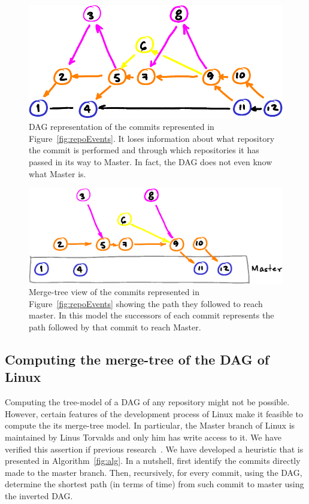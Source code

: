 \documentclass[conference, draftclsnofoot, draft]{IEEEtran}
\begin{document}
\begin{figure}[htbp]
  \centering
        \includegraphics[width=.8\columnwidth]{figures/dag.pdf}
  \caption{DAG representation of the commits represented in Figure~\ref{fig:repoEvents}. It loses information about what repository the commit is performed and
    through which repositories it has passed in its way to Master. In fact, the DAG does not even know what Master is.}
  \label{fig:repoDAG}
\end{figure}

\begin{figure}[htbp]
  \centering
        \includegraphics[width=\columnwidth]{figures/tree.pdf}
  \caption{Merge-tree view of the commits  represented in Figure~\ref{fig:repoEvents} showing the path they followed to reach master. In this model the successors of
    each commit represents the path followed by that commit to reach Master.}
  \label{fig:repoTree}
\end{figure}


\subsection{Computing the merge-tree of the DAG of Linux}

Computing the tree-model of a DAG of any repository might not be possible. However, certain features of the development process of Linux make it feasible to
compute the its merge-tree model. In particular, the Master branch of Linux is maintained by Linus Torvalds and only him has write access to it. We have verified this
assertion if previous research~\cite{German2015}. We have developed a heuristic that is presented in Algorithm~\ref{fig:alg}. In a nutshell, first identify the commits directly made
to the master branch. Then,
recursively, for
every commit, using the DAG, determine the shortest path (in terms of time) from such commit to master using the inverted DAG.
\end{document}
